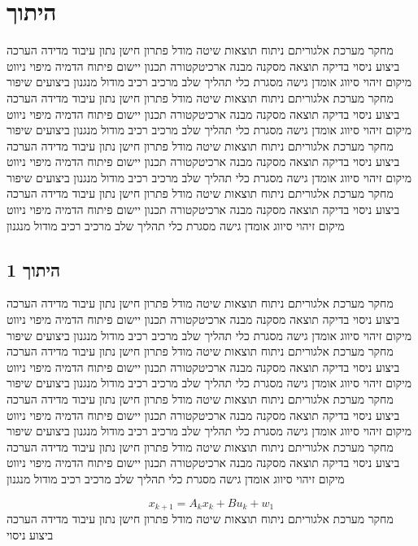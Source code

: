 \section{היתוך}
\label{sec:ch05}

מחקר מערכת אלגוריתם ניתוח תוצאות שיטה מודל פתרון חישן נתון עיבוד מדידה הערכה ביצוע ניסוי בדיקה תוצאה מסקנה מבנה ארכיטקטורה תכנון יישום פיתוח הדמיה מיפוי ניווט מיקום זיהוי סיווג אומדן גישה מסגרת כלי תהליך שלב מרכיב רכיב מודול מנגנון ביצועים שיפור מחקר מערכת אלגוריתם ניתוח תוצאות שיטה מודל פתרון חישן נתון עיבוד מדידה הערכה ביצוע ניסוי בדיקה תוצאה מסקנה מבנה ארכיטקטורה תכנון יישום פיתוח הדמיה מיפוי ניווט מיקום זיהוי סיווג אומדן גישה מסגרת כלי תהליך שלב מרכיב רכיב מודול מנגנון ביצועים שיפור מחקר מערכת אלגוריתם ניתוח תוצאות שיטה מודל פתרון חישן נתון עיבוד מדידה הערכה ביצוע ניסוי בדיקה תוצאה מסקנה מבנה ארכיטקטורה תכנון יישום פיתוח הדמיה מיפוי ניווט מיקום זיהוי סיווג אומדן גישה מסגרת כלי תהליך שלב מרכיב רכיב מודול מנגנון ביצועים שיפור מחקר מערכת אלגוריתם ניתוח תוצאות שיטה מודל פתרון חישן נתון עיבוד מדידה הערכה ביצוע ניסוי בדיקה תוצאה מסקנה מבנה ארכיטקטורה תכנון יישום פיתוח הדמיה מיפוי ניווט מיקום זיהוי סיווג אומדן גישה מסגרת כלי תהליך שלב מרכיב רכיב מודול מנגנון

\subsection{היתוך 1}
\label{sub:ch05_1}
מחקר מערכת אלגוריתם ניתוח תוצאות שיטה מודל פתרון חישן נתון עיבוד מדידה הערכה ביצוע ניסוי בדיקה תוצאה מסקנה מבנה ארכיטקטורה תכנון יישום פיתוח הדמיה מיפוי ניווט מיקום זיהוי סיווג אומדן גישה מסגרת כלי תהליך שלב מרכיב רכיב מודול מנגנון ביצועים שיפור מחקר מערכת אלגוריתם ניתוח תוצאות שיטה מודל פתרון חישן נתון עיבוד מדידה הערכה ביצוע ניסוי בדיקה תוצאה מסקנה מבנה ארכיטקטורה תכנון יישום פיתוח הדמיה מיפוי ניווט מיקום זיהוי סיווג אומדן גישה מסגרת כלי תהליך שלב מרכיב רכיב מודול מנגנון ביצועים שיפור מחקר מערכת אלגוריתם ניתוח תוצאות שיטה מודל פתרון חישן נתון עיבוד מדידה הערכה ביצוע ניסוי בדיקה תוצאה מסקנה מבנה ארכיטקטורה תכנון יישום פיתוח הדמיה מיפוי ניווט מיקום זיהוי סיווג אומדן גישה מסגרת כלי תהליך שלב מרכיב רכיב מודול מנגנון ביצועים שיפור מחקר מערכת אלגוריתם ניתוח תוצאות שיטה מודל פתרון חישן נתון עיבוד מדידה הערכה ביצוע ניסוי בדיקה תוצאה מסקנה מבנה ארכיטקטורה תכנון יישום פיתוח הדמיה מיפוי ניווט מיקום זיהוי סיווג אומדן גישה מסגרת כלי תהליך שלב מרכיב רכיב מודול מנגנון

\begin{equation}
    x_{k+1} = A_{k} x_k + B u_{k} + w_{1}
    \label{eq:ch05_1}
\end{equation}
מחקר מערכת אלגוריתם ניתוח תוצאות שיטה מודל פתרון חישן נתון עיבוד מדידה הערכה ביצוע ניסוי

